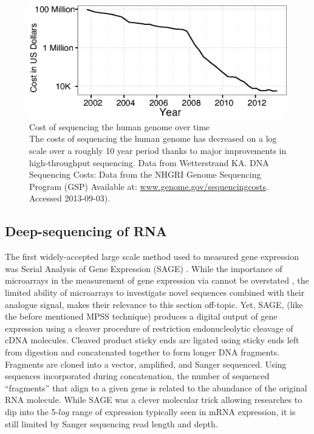     \begin{figure}[htbp] %
      \centering 
      \includegraphics{Figures/Chapter1/Sequencing_costs_over_time.eps}
      \caption[Cost of sequencing the human genome over time]
      {
        Cost of sequencing the human genome over time\\[0.25cm]
        The costs of sequencing the human genome has decreased on a log scale over a roughly 10 year period thanks to major improvements in high-throughput sequencing. Data from Wetterstrand KA. DNA Sequencing Costs: Data from the NHGRI Genome Sequencing Program (GSP) Available at: \url{www.genome.gov/sequencingcosts}. Accessed 2013-09-03).
        }
      \label{fig:SeqCosts}
      \end{figure}

  \subsection{Deep-sequencing of RNA}\label{sec: Types of HTS}

    The first widely-accepted large scale method used to measured gene expression was Serial Analysis of Gene Expression (SAGE) \citep{Velculescu1995a}. While the importance of microarrays in the measurement of gene expression via cannot be overstated \citep{Shendure2008,Marioni2008}, the limited ability of microarrays to investigate novel sequences combined with their analogue signal, makes their relevance to this section off-topic. Yet, SAGE, (like the before mentioned MPSS technique) produces a digital output of gene expression using a cleaver procedure of restriction endonucleolytic cleavage of cDNA molecules. Cleaved product sticky ends are ligated using sticky ends left from digestion and concatenated together to form longer DNA fragments. Fragments are cloned into a vector, amplified, and Sanger sequenced. Using sequences incorporated during concatenation, the number of sequenced ``fragments'' that align to a given gene is related to the abundance of the original RNA molecule. While SAGE was a clever molecular trick allowing researches to dip into the 5-$log$ range of expression typically seen in mRNA expression, it is still limited by Sanger sequencing read length and depth.

